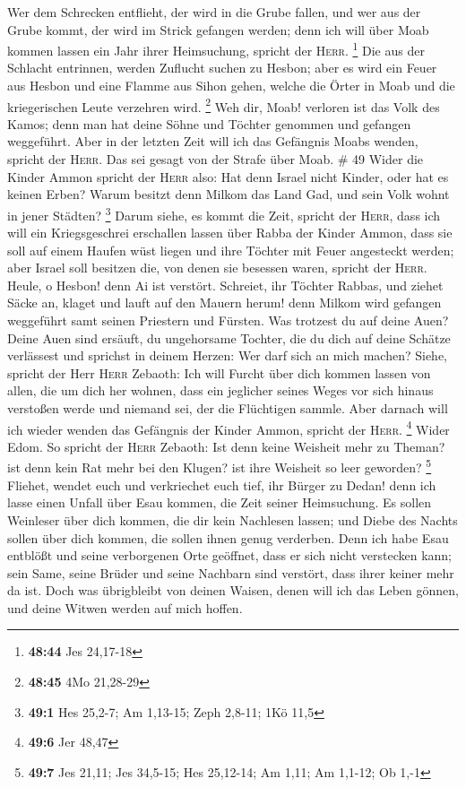  Wer dem Schrecken entflieht, der wird in die Grube
fallen, und wer aus der Grube kommt, der wird im Strick gefangen werden;
denn ich will über Moab kommen lassen ein Jahr ihrer Heimsuchung,
spricht der \textsc{Herr}. \footnote{\textbf{48:44} Jes 24,17-18}
 Die aus der Schlacht entrinnen, werden Zuflucht suchen
zu Hesbon; aber es wird ein Feuer aus Hesbon und eine Flamme aus Sihon
gehen, welche die Örter in Moab und die kriegerischen Leute verzehren
wird. \footnote{\textbf{48:45} 4Mo 21,28-29}  Weh dir,
Moab! verloren ist das Volk des Kamos; denn man hat deine Söhne und
Töchter genommen und gefangen weggeführt.  Aber in der
letzten Zeit will ich das Gefängnis Moabs wenden, spricht der
\textsc{Herr}. Das sei gesagt von der Strafe über Moab. \# 49
 Wider die Kinder Ammon spricht der \textsc{Herr} also:
Hat denn Israel nicht Kinder, oder hat es keinen Erben? Warum besitzt
denn Milkom das Land Gad, und sein Volk wohnt in jener Städten?
\footnote{\textbf{49:1} Hes 25,2-7; Am 1,13-15; Zeph 2,8-11; 1Kö 11,5}
 Darum siehe, es kommt die Zeit, spricht der
\textsc{Herr}, dass ich will ein Kriegsgeschrei erschallen lassen über
Rabba der Kinder Ammon, dass sie soll auf einem Haufen wüst liegen und
ihre Töchter mit Feuer angesteckt werden; aber Israel soll besitzen die,
von denen sie besessen waren, spricht der \textsc{Herr}. 
Heule, o Hesbon! denn Ai ist verstört. Schreiet, ihr Töchter Rabbas, und
ziehet Säcke an, klaget und lauft auf den Mauern herum! denn Milkom wird
gefangen weggeführt samt seinen Priestern und Fürsten. 
Was trotzest du auf deine Auen? Deine Auen sind ersäuft, du ungehorsame
Tochter, die du dich auf deine Schätze verlässest und sprichst in deinem
Herzen: Wer darf sich an mich machen?  Siehe, spricht der
Herr \textsc{Herr} Zebaoth: Ich will Furcht über dich kommen lassen von
allen, die um dich her wohnen, dass ein jeglicher seines Weges vor sich
hinaus verstoßen werde und niemand sei, der die Flüchtigen sammle.
 Aber darnach will ich wieder wenden das Gefängnis der
Kinder Ammon, spricht der \textsc{Herr}. \footnote{\textbf{49:6} Jer
  48,47}  Wider Edom. So spricht der \textsc{Herr}
Zebaoth: Ist denn keine Weisheit mehr zu Theman? ist denn kein Rat mehr
bei den Klugen? ist ihre Weisheit so leer geworden? \footnote{\textbf{49:7}
  Jes 21,11; Jes 34,5-15; Hes 25,12-14; Am 1,11; Am 1,1-12; Ob 1,-1}
 Fliehet, wendet euch und verkriechet euch tief, ihr
Bürger zu Dedan! denn ich lasse einen Unfall über Esau kommen, die Zeit
seiner Heimsuchung.  Es sollen Weinleser über dich kommen,
die dir kein Nachlesen lassen; und Diebe des Nachts sollen über dich
kommen, die sollen ihnen genug verderben.  Denn ich habe
Esau entblößt und seine verborgenen Orte geöffnet, dass er sich nicht
verstecken kann; sein Same, seine Brüder und seine Nachbarn sind
verstört, dass ihrer keiner mehr da ist.  Doch was
übrigbleibt von deinen Waisen, denen will ich das Leben gönnen, und
deine Witwen werden auf mich hoffen.


